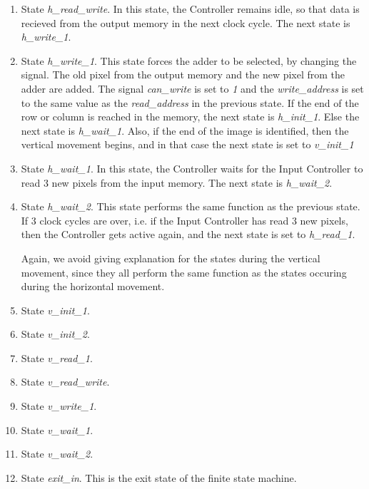 \documentclass[11pt,a4paper]{article}
\begin{document}
\begin{enumerate}
\item State \textit{h\_read\_write}. In this state, the Controller remains idle, so that data is recieved from the output memory in the next clock cycle. The next state is \textit{h\_write\_1}. 

\item State \textit{h\_write\_1}. This state forces the adder to be selected, by changing the  signal. The old pixel from the output memory and the new pixel from the adder are added. The signal \textit{can\_write} is set to \textit{1} and the \textit{write\_address} is set to the same value as the \textit{read\_address} in the previous state. If the end of the row or column is reached in the memory, the next state is \textit{h\_init\_1}. Else the next state is \textit{h\_wait\_1}. Also, if the end of the image is identified, then the vertical movement begins, and in that case the next state is set to \textit{v\_init\_1}

\item State \textit{h\_wait\_1}. In this state, the Controller waits for the Input Controller to read 3 new pixels from the input memory. The next state is \textit{h\_wait\_2}.

\item State \textit{h\_wait\_2}. This state performs the same function as the previous state. If 3 clock cycles are over, i.e. if the Input Controller has read 3 new pixels, then the Controller gets active again, and the next state is set to \textit{h\_read\_1}.

Again, we avoid giving explanation for the states during the vertical movement, since they all perform the same function as the states occuring during the horizontal movement.
\item State \textit{v\_init\_1}. 

\item State \textit{v\_init\_2}. 

\item State \textit{v\_read\_1}. 

\item State \textit{v\_read\_write}. 

\item State \textit{v\_write\_1}. 

\item State \textit{v\_wait\_1}. 

\item State \textit{v\_wait\_2}.

\item State \textit{exit\_in}. This is the exit state of the finite state machine.

\end{enumerate}
\end{document}
